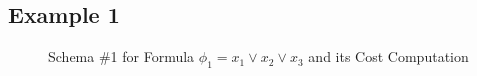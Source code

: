 \documentclass{llncs}
\begin{document}
\subsection{Example 1}

\begin{figure}
\caption{Schema \#1 for Formula $\phi_1 = x_1 \lor x_2 \lor x_3$ and its Cost Computation}
\label{fig:c3:schema}
\end{figure}
\end{document}
